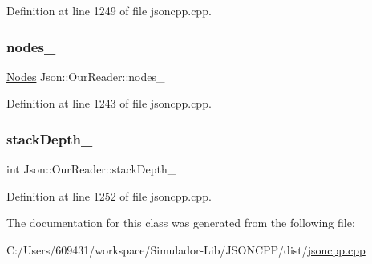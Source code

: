 Definition at line 1249 of file jsoncpp.\+cpp.

\hypertarget{class_json_1_1_our_reader_a19cc4e8c5d17ee6822f752e9a36f4ce3}{}\label{class_json_1_1_our_reader_a19cc4e8c5d17ee6822f752e9a36f4ce3} 
\subsubsection{\texorpdfstring{nodes\+\_\+}{nodes\_}}
{\footnotesize\ttfamily \hyperlink{class_json_1_1_our_reader_a8480a5ef159cee3a090f96358414d8d3}{Nodes} Json\+::\+Our\+Reader\+::nodes\+\_\+\hspace{0.3cm}{\ttfamily [private]}}



Definition at line 1243 of file jsoncpp.\+cpp.

\hypertarget{class_json_1_1_our_reader_aaa91c93bc064c7086248ea01eddcf51a}{}\label{class_json_1_1_our_reader_aaa91c93bc064c7086248ea01eddcf51a} 
\subsubsection{\texorpdfstring{stack\+Depth\+\_\+}{stackDepth\_}}
{\footnotesize\ttfamily int Json\+::\+Our\+Reader\+::stack\+Depth\+\_\+\hspace{0.3cm}{\ttfamily [private]}}



Definition at line 1252 of file jsoncpp.\+cpp.



The documentation for this class was generated from the following file\+:\begin{DoxyCompactItemize}
\item 
C\+:/\+Users/609431/workspace/\+Simulador-\/\+Lib/\+J\+S\+O\+N\+C\+P\+P/dist/\hyperlink{jsoncpp_8cpp}{jsoncpp.\+cpp}\end{DoxyCompactItemize}
